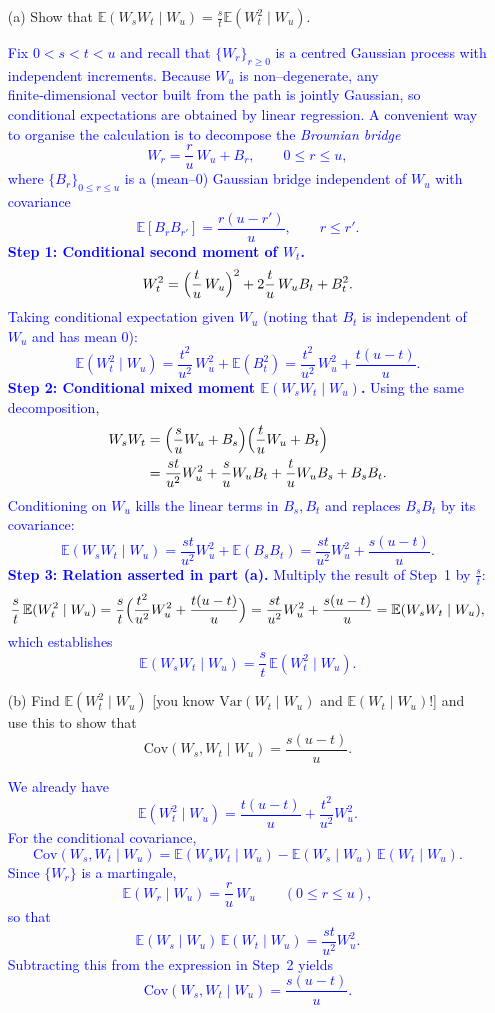 \documentclass{article}
\begin{document}
\begin{enumerate}
    \item[(a)] Show that $\mathbb{E}(W_s W_t \mid W_u) = \frac{s}{t} \mathbb{E}(W_t^2 \mid W_u)$.

    \textcolor{blue}{
Fix $0<s<t<u$ and recall that $\{W_r\}_{r\ge 0}$ is a centred Gaussian process with independent increments.  
Because $W_u$ is non--degenerate, any finite‑dimensional vector built from the path is jointly Gaussian, so conditional expectations are obtained by linear regression.  A convenient way to organise the calculation is to decompose the \emph{Brownian bridge}
$$
W_r=\frac{r}{u}\,W_u+B_r,\qquad 0\le r\le u,
$$
where $\{B_r\}_{0\le r\le u}$ is a (mean–$0$) Gaussian bridge independent of $W_u$ with covariance  
$$
\mathbb{E}[B_rB_{r'}]=\frac{r(u-r')}{u},\qquad r\le r'.
$$
\medskip
\textbf{Step 1:  Conditional second moment of $W_t$.}
$$
W_t^2=\Bigl(\frac{t}{u}\,W_u\Bigr)^2+2\frac{t}{u}\,W_uB_t+B_t^2.
$$
Taking conditional expectation given $W_u$ (noting that $B_t$ is independent of $W_u$ and has mean $0$):
$$
\mathbb{E}(W_t^2\mid W_u)=\frac{t^2}{u^2}\,W_u^2+\mathbb{E}(B_t^2)
                           =\frac{t^2}{u^2}\,W_u^2+\frac{t(u-t)}{u}.
$$
\medskip
\textbf{Step 2:  Conditional mixed moment $\mathbb{E}(W_sW_t\mid W_u)$.}
Using the same decomposition,
$$
\begin{aligned}
W_sW_t&=\Bigl(\frac{s}{u}W_u+B_s\Bigr)\Bigl(\frac{t}{u}W_u+B_t\Bigr)\\
      &=\frac{st}{u^2}W_u^2+\frac{s}{u}W_uB_t+\frac{t}{u}W_uB_s+B_sB_t.
\end{aligned}
$$
Conditioning on $W_u$ kills the linear terms in $B_s,B_t$ and replaces $B_sB_t$ by its covariance:
$$
\mathbb{E}(W_sW_t\mid W_u)=\frac{st}{u^2}W_u^2+\mathbb{E}(B_sB_t)
                           =\frac{st}{u^2}W_u^2+\frac{s(u-t)}{u}.
$$
\medskip
\textbf{Step 3:  Relation asserted in part (a).}
Multiply the result of Step 1 by $\tfrac{s}{t}$:
$$
\frac{s}{t}\,\mathbb{E}(W_t^2\mid W_u)
       =\frac{s}{t}\Bigl(\frac{t^2}{u^2}W_u^2+\frac{t(u-t)}{u}\Bigr)
       =\frac{st}{u^2}W_u^2+\frac{s(u-t)}{u}
       =\mathbb{E}(W_sW_t\mid W_u),
$$
which establishes
$$
\boxed{\;
\mathbb{E}(W_sW_t\mid W_u)=\frac{s}{t}\,\mathbb{E}(W_t^2\mid W_u).
\;}
$$
    }



    \item[(b)] Find $\mathbb{E}(W_t^2 \mid W_u)$ [you know $\mathrm{Var}(W_t \mid W_u)$ and $\mathbb{E}(W_t \mid W_u)$!] and use this to show that
    \[
    \mathrm{Cov}(W_s, W_t \mid W_u) = \frac{s(u-t)}{u}.
    \]

    \textcolor{blue}{
We already have
$$
\boxed{\;
\mathbb{E}(W_t^2\mid W_u)=\frac{t(u-t)}{u}+\frac{t^2}{u^2}W_u^2.
\;}
$$
For the conditional covariance,
$$
\mathrm{Cov}(W_s,W_t\mid W_u)
=\mathbb{E}(W_sW_t\mid W_u)-\mathbb{E}(W_s\mid W_u)\,\mathbb{E}(W_t\mid W_u).
$$
Since $\{W_r\}$ is a martingale,
$$
\mathbb{E}(W_r\mid W_u)=\frac{r}{u}\,W_u\qquad(0\le r\le u),
$$
so that
$$
\mathbb{E}(W_s\mid W_u)\,\mathbb{E}(W_t\mid W_u)=\frac{st}{u^2}W_u^2.
$$
Subtracting this from the expression in Step 2 yields
$$
\boxed{\;
\mathrm{Cov}(W_s,W_t\mid W_u)=\frac{s(u-t)}{u}.
\;}
$$
    }
\end{enumerate}
\end{document}
